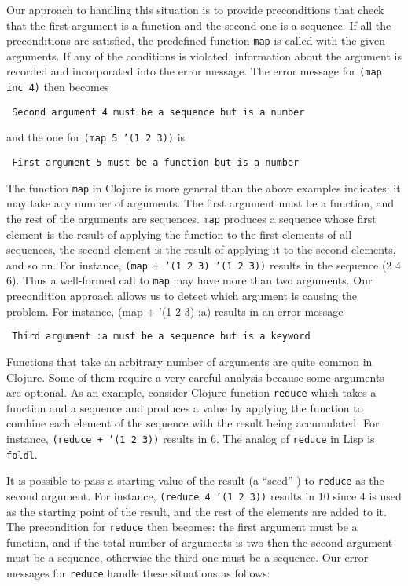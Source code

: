 \documentclass[submission,copyright,creativecommons]{eptcs}
\newcommand{\clocode}[1]{{\tt {#1}}}
\begin{document}
Our approach to handling this situation is to provide preconditions that check that the first argument is a function and the second one is a sequence. If all the preconditions are satisfied, the predefined function \clocode{map} is called with the given arguments. If any of the conditions is violated, information about the argument is recorded and incorporated into the error message. The error message for \clocode{(map inc 4)} then becomes

{\tt 
Second argument 4 must be a sequence but is a number
}

\noindent 
and the one for \clocode{(map 5 '(1 2 3))} is 

{\tt
First argument 5 must be a function but is a number
}

The function \clocode{map} in Clojure is more general than the above examples indicates: it may take any number of arguments. The first argument must be a function, and the rest of the arguments are sequences. \clocode{map} produces a sequence whose first element is the result of applying the function to the first elements of all sequences, the second element is the result of applying it to the second elements, and so on. For instance, \clocode{(map + '(1 2 3) '(1 2 3))} results in the sequence {(2 4 6)}.
Thus a well-formed call to {\tt map} may have more than two arguments. Our precondition approach allows us to detect which argument is causing the problem. For instance, {(map + '(1 2 3) :a)} results in an error message

{\tt
 Third argument :a must be a sequence but is a keyword
}

Functions that take an arbitrary number of arguments are quite common in Clojure. Some of them require a very careful analysis because some arguments are optional. As an example, consider Clojure function \clocode{reduce} which takes a function and a sequence and produces a value by applying the function to combine each element of the sequence with the result being accumulated. For instance, \clocode{(reduce + '(1 2 3))} results in $6$. The analog of \clocode{reduce} in Lisp is \clocode{foldl}. 

It is possible to pass a starting value of the result  (a  ``seed'' ) to \clocode{reduce} as the second argument.  For instance, \clocode{(reduce 4 '(1 2 3))} results in $10$ since $4$ is used as the starting point of the result, and the rest of the elements are added to it. The precondition for \clocode{reduce} then becomes: the first argument must be a function, and if the total number of arguments is two then the second argument must be a sequence, otherwise the third one must be a sequence. Our error messages for \clocode{reduce} handle these situations as follows: 
\end{document}
